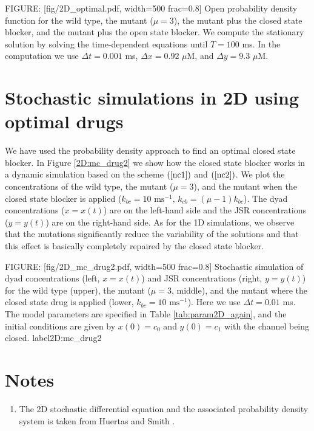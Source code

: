 {FIGURE: [fig/2D_optimal.pdf, width=500 frac=0.8] Open probability density function for the wild type, the mutant ($\mu=3$), the mutant plus the closed state blocker, and the mutant plus the open state blocker. We compute the stationary solution by solving the time-dependent equations until $T=100$ ms. In the computation we use $\Delta t=0.001$ ms, $\Delta x=0.92$ $\mu$M,  and  $\Delta y=9.3$ $\mu$M. %
}

\section{Stochastic simulations in 2D using optimal drugs}

We have used the probability density approach to find an optimal closed state blocker. In Figure \ref{2D:mc_drug2} 
we show how the closed state blocker works in a dynamic simulation based on the scheme 
$(\ref{nc1})$ and $(\ref{nc2})$. We plot the concentrations of the wild type, the mutant ($\mu=3$), and the mutant when the closed state blocker is applied ($k_{bc}=10 \text{ ms}^{-1},\, k_{cb}=(\mu-1)k_{bc}$). The dyad concentrations ($x=x(t)$) are on the left-hand side and the JSR concentrations
($y=y(t)$) are on the right-hand side. As for the 1D simulations, we observe that the mutations significantly reduce the variability of the solutions and that this effect is basically completely repaired by the closed state blocker.

FIGURE: [fig/2D_mc_drug2.pdf, width=500 frac=0.8] Stochastic simulation of dyad concentrations (left, $x=x(t)$) and JSR concentrations
(right, $y=y(t)$) for the wild type (upper), the mutant ($\mu=3$, middle), and the mutant where the closed state drug is applied (lower, $k_{bc}=10 \text{ ms}^{-1}$).
Here we use $\Delta t=0.01$ ms. The model parameters are specified in Table \ref{tab:param2D_again}, and the initial conditions
are given by $x(0) = c_0$ and $y(0) = c_1$ with the channel being closed.
 label{2D:mc_drug2}\section{Notes}

\begin{enumerate}
\item The 2D stochastic differential equation and the associated probability density system
is taken from  Huertas and Smith \cite{Huertas2007}.
\end{enumerate}
